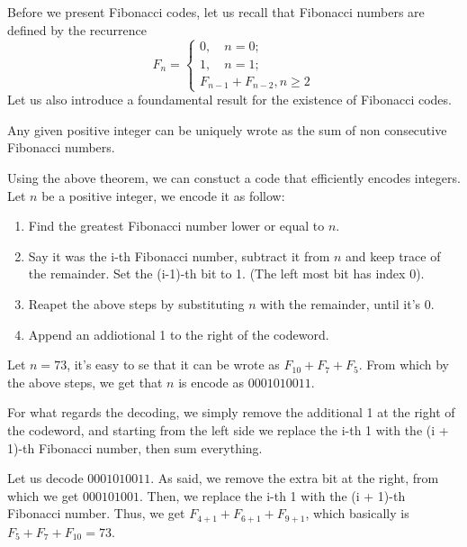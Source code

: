 \documentclass{subfiles}
\begin{document}
    Before we present Fibonacci codes, 
        let us recall that Fibonacci numbers are defined by the recurrence
        \[
            F_{n} = \begin{cases}
                0, \quad n = 0; \\
                1, \quad n = 1; \\ 
                F_{n - 1} + F_{n - 2}, n \ge 2
            \end{cases}
        \]
    Let us also introduce a foundamental result for the existence of Fibonacci codes.
    \begin{theorem*}[Zackendorf]
        Any given positive integer can be uniquely wrote
            as the sum of non consecutive Fibonacci numbers. 
    \end{theorem*}

    Using the above theorem, we can constuct a code that efficiently encodes integers.
    Let \(n\) be a positive integer, we encode it as follow:
        \begin{enumerate}
            \item Find the greatest Fibonacci number lower or equal to \(n\).
            \item Say it was the i-th Fibonacci number, subtract it from \(n\)
                and keep trace of the remainder. Set the (i-1)-th bit to 1.
                (The left most bit has index 0).
            \item Reapet the above steps by substituting \(n\) with the remainder,
                until it's 0.
            \item Append an addiotional 1 to the right of the codeword.
        \end{enumerate}

        \begin{example*}
            Let \(n = 73\), it's easy to se that it can be wrote as
                \(F_{10} + F_{7} + F_{5}\). From which by the above steps,
                we get that \(n\) is encode as \(0001010011\).
        \end{example*}

    For what regards the decoding, 
        we simply remove the additional 1 at the right of the codeword,
        and starting from the left side we replace the i-th 1 with the 
        (i + 1)-th Fibonacci number, then sum everything.
        \begin{example*}
            Let us decode \(0001010011\). 
                As said, we remove the extra bit at the right, 
                from which we get \(000101001\).
            Then, we replace the i-th 1 with the (i + 1)-th Fibonacci number. 
            Thus, we get \( F_{4 + 1} + F_{6 + 1} + F_{9 + 1}\),
                which basically is \(F_{5} + F_{7} + F_{10} = 73\).
        \end{example*}
\end{document}
